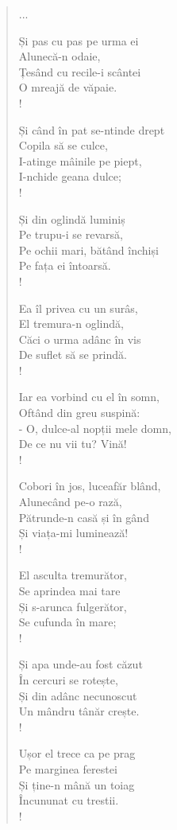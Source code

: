 \documentclass{article}
\begin{document}
\begin{small}
\begin{multicols}{3}
\begin{verse}
...

Și pas cu pas pe urma ei \\
Alunecă-n odaie, \\
Țesând cu recile-i scântei \\
O mreajă de văpaie. \\!

Și când în pat se-ntinde drept \\
Copila să se culce, \\
I-atinge mâinile pe piept, \\
I-nchide geana dulce; \\!

Și din oglindă luminiș \\
Pe trupu-i se revarsă, \\
Pe ochii mari, bătând închiși \\
Pe fața ei întoarsă. \\!

Ea îl privea cu un surâs, \\
El tremura-n oglindă, \\
Căci o urma adânc în vis \\
De suflet să se prindă. \\!

Iar ea vorbind cu el în somn, \\
Oftând din greu suspină: \\
- O, dulce-al nopții mele domn, \\
De ce nu vii tu? Vină! \\!

Cobori în jos, luceafăr blând, \\
Alunecând pe-o rază, \\
Pătrunde-n casă și în gând \\
Și viața-mi luminează! \\!

El asculta tremurător, \\
Se aprindea mai tare \\
Și s-arunca fulgerător, \\
Se cufunda în mare; \\!

Și apa unde-au fost căzut \\
În cercuri se rotește, \\
Și din adânc necunoscut \\
Un mândru tânăr crește. \\!

Ușor el trece ca pe prag \\
Pe marginea ferestei \\
Și ține-n mână un toiag \\
Încununat cu trestii. \\!


\end{verse}
\end{multicols}
\end{small}
\end{document}
